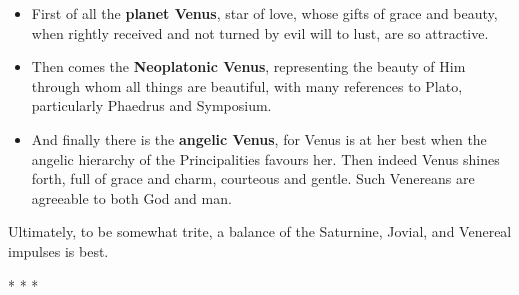 \begin{itemize}


\item First of all the \textbf{planet Venus}, star of love, whose gifts of grace and beauty, when rightly received and not turned by evil will to lust, are so attractive.

\item Then comes the \textbf{Neoplatonic Venus}, representing the beauty of Him through whom all things are beautiful, with many references to Plato, particularly Phaedrus and Symposium.

\item And finally there is the \textbf{angelic Venus}, for Venus is at her best when the angelic hierarchy of the Principalities favours her. Then indeed Venus shines forth, full of grace and charm, courteous and gentle. Such Venereans are agreeable to both God and man.
\end{itemize}

Ultimately, to be somewhat trite, a balance of the Saturnine, Jovial, and Venereal impulses is best.



\begin{center}* * *\end{center}


